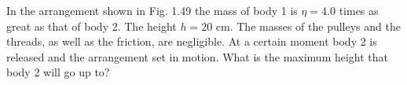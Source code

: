 \item In the arrangement shown in Fig. 1.49 the mass of body 1 is $\eta=4.0$ times as great as that of body 2. The height $h=20 \text{ cm}$. The masses of the pulleys and the threads, as well as the friction, are negligible. At a certain moment body 2 is released and the arrangement set in motion. What is the maximum height that body 2 will go up to?
    \begin{center}
    \end{center}